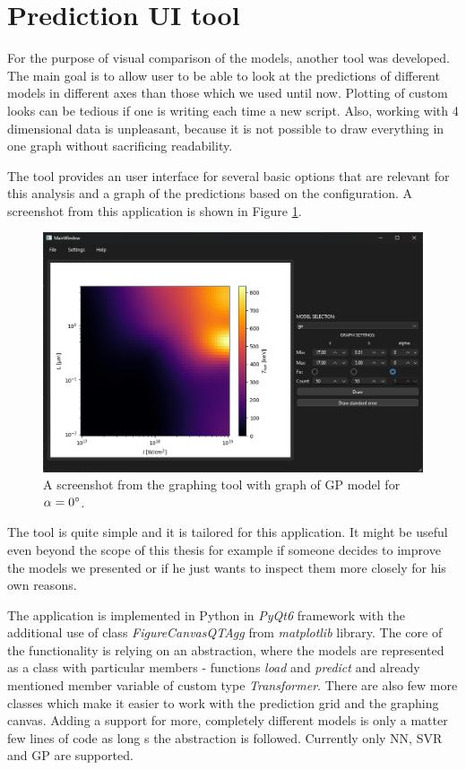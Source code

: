 \newpage

\section{Prediction UI tool}
For the purpose of visual comparison of the models, another tool was developed. The main goal is to allow user to be able to look at the predictions of different models in different axes than those which we used until now. Plotting of custom looks can be tedious if one is writing each time a new script. Also, working with 4 dimensional data is unpleasant, because it is not possible to draw everything in one graph without sacrificing readability.

The tool provides an user interface for several basic options that are relevant for this analysis and a graph of the predictions based on the configuration. A screenshot from this application is shown in Figure \ref{fig:graph-tool}.

\begin{figure}[h]
	\centering
	\includegraphics[width=0.80 \textwidth]{figures/graph_tool}
	\caption{A screenshot from the graphing tool with graph of GP model for $\alpha = 0\degree$.}
	\label{fig:graph-tool}
\end{figure}

The tool is quite simple and it is tailored for this application. It might be useful even beyond the scope of this thesis for example if someone decides to improve the models we presented or if he just wants to inspect them more closely for his own reasons. 

The application is implemented in Python in \textit{PyQt6} framework with the additional use of class \textit{FigureCanvasQTAgg} from \textit{matplotlib} library. The core of the functionality is relying on an abstraction, where the models are represented as a class with particular members - functions \textit{load} and \textit{predict} and already mentioned member variable of custom type \textit{Transformer}. There are also few more classes which make it easier to work with the prediction grid and the graphing canvas. Adding a support for more, completely different models is only a matter few lines of code as long s the abstraction is followed. Currently only NN, SVR and GP are supported.

